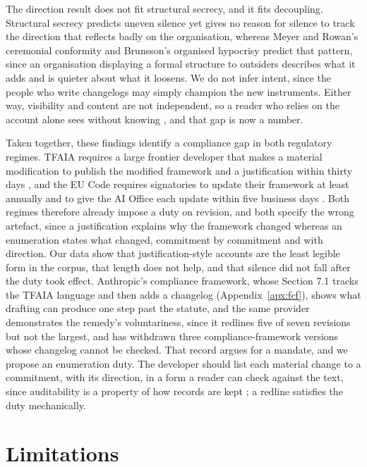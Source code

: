 \documentclass{article}
\begin{document}
The direction result does not fit structural secrecy, and it fits decoupling. Structural secrecy predicts uneven silence yet gives no reason for silence to track the direction that reflects badly on the organisation, whereas Meyer and Rowan's ceremonial conformity and Brunsson's organised hypocrisy predict that pattern, since an organisation displaying a formal structure to outsiders describes what it adds and is quieter about what it loosens. We do not infer intent, since the people who write changelogs may simply champion the new instruments. Either way, visibility and content are not independent, so a reader who relies on the account alone sees without knowing \citep{ananny2018seeing}, and that gap is now a number.

Taken together, these findings identify a compliance gap in both regulatory regimes. TFAIA requires a large frontier developer that makes a material modification to publish the modified framework and a justification within thirty days \citep{california2025sb53}, and the EU Code requires signatories to update their framework at least annually and to give the AI Office each update within five business days \citep{eu2025gpai}. Both regimes therefore already impose a duty on revision, and both specify the wrong artefact, since a justification explains why the framework changed whereas an enumeration states what changed, commitment by commitment and with direction. Our data show that justification-style accounts are the least legible form in the corpus, that length does not help, and that silence did not fall after the duty took effect. Anthropic's compliance framework, whose Section 7.1 tracks the TFAIA language and then adds a changelog (Appendix~\ref{apx:fcf}), shows what drafting can produce one step past the statute, and the same provider demonstrates the remedy's voluntariness, since it redlines five of seven revisions but not the largest, and has withdrawn three compliance-framework versions whose changelog cannot be checked. That record argues for a mandate, and we propose an enumeration duty. The developer should list each material change to a commitment, with its direction, in a form a reader can check against the text, since auditability is a property of how records are kept \citep{power1997audit}; a redline satisfies the duty mechanically.

\section{Limitations}
\label{sec:limits}
\end{document}
